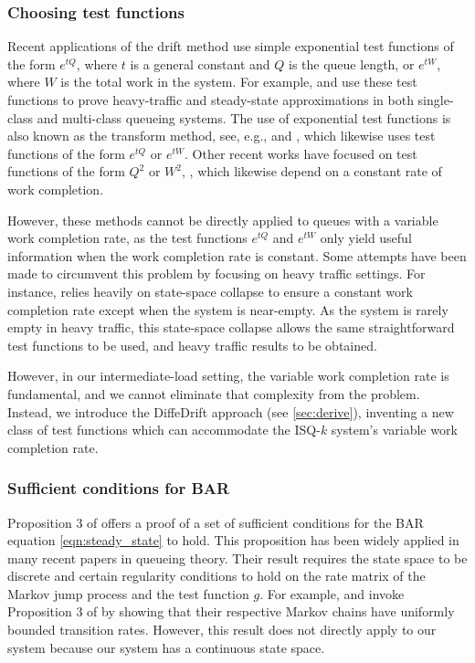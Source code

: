 \subsubsection{Choosing test functions}

Recent applications of the drift method use simple exponential test functions of the form $e^{tQ}$, where $t$ is a general constant and $Q$ is the queue length, or $e^{tW}$, where $W$ is the total work in the system. For example, \cite{Braverman2017} and \cite{Braverman2024} use these test functions to prove
heavy-traffic and steady-state approximations in both single-class and multi-class queueing systems. The use of exponential test functions is also known as the transform method, see, e.g., \cite{Hurtado-Lange2020} and \cite{jhunjhunwala2023}, which likewise uses test functions of the form $e^{tQ}$ or $e^{tW}$. Other recent works have focused on test functions of the form $Q^2$ or $W^2$, \cite{Grosof2022MSJ}, which  likewise depend on a constant rate of work completion.

However, these methods cannot be directly applied to queues with a variable work completion rate, as the test functions $e^{tQ}$ and $e^{tW}$ only yield useful information when the work completion rate is constant. Some attempts have been made to circumvent this problem by focusing on heavy traffic settings. For instance, \cite{Hurtado-Lange2020} relies heavily on state-space collapse to ensure a constant work completion rate except when the system is near-empty. As the system is rarely empty in heavy traffic, this state-space collapse allows the same straightforward test functions to be used, and heavy traffic results to be obtained.

However, in our intermediate-load setting, the variable work completion rate is fundamental, and we cannot eliminate that complexity from the problem. Instead, we introduce the DiffeDrift approach (see \cref{sec:derive}), inventing a new class of test functions which can accommodate the ISQ-$k$ system's variable work completion rate.


\subsubsection{Sufficient conditions for BAR} Proposition 3 of \cite{Glynn2008} offers a proof of a set of sufficient conditions for the BAR equation \eqref{eqn:steady_state} to hold. This proposition has been widely applied in many recent papers in queueing theory. Their result requires the state space to be discrete and certain regularity conditions to hold on the rate matrix of the Markov jump process and the test function $g$. For example, \cite{Grosof2023TRaM} and \cite{Hong2023} invoke Proposition 3 of \cite{Glynn2008} by showing that their respective Markov chains have uniformly bounded transition rates. However, this result does not directly apply to our system because our system has a continuous state space.


